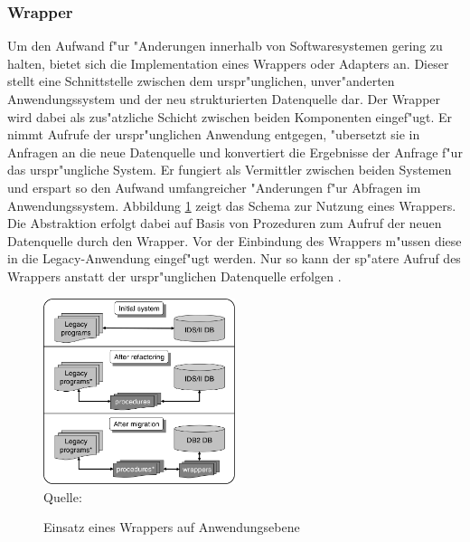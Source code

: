 \subsubsection{Wrapper}

Um den Aufwand f"ur "Anderungen innerhalb von Softwaresystemen gering zu halten, bietet sich die Implementation eines Wrappers oder Adapters an. Dieser stellt eine Schnittstelle zwischen dem urspr"unglichen, unver"anderten Anwendungssystem und der neu strukturierten Datenquelle dar. Der Wrapper wird dabei als zus"atzliche Schicht zwischen beiden Komponenten eingef"ugt. Er nimmt Aufrufe der urspr"unglichen Anwendung entgegen, "ubersetzt sie in Anfragen an die neue Datenquelle und konvertiert die Ergebnisse der Anfrage f"ur das urspr"ungliche System. Er fungiert als Vermittler zwischen beiden Systemen und erspart so den Aufwand umfangreicher "Anderungen f"ur Abfragen im Anwendungssystem.
\lb
Abbildung \ref{pic:application_wrapper} zeigt das Schema zur Nutzung eines Wrappers. Die Abstraktion erfolgt dabei auf Basis von Prozeduren zum Aufruf der neuen Datenquelle durch den Wrapper. Vor der Einbindung des Wrappers m"ussen diese in die Legacy-Anwendung eingef"ugt werden. Nur so kann der sp"atere Aufruf des Wrappers anstatt der urspr"unglichen Datenquelle erfolgen \cite{henrard-2008}. 

\begin{figure}[h!]
	\centering
	\caption{Einsatz eines Wrappers auf Anwendungsebene}
	\label{pic:application_wrapper}
	\includegraphics[width=0.5\textwidth]{../images/large_scale_fig_01.png} \\
	\tiny Quelle: \citep[Abbildung~1]{henrard-2008}
\end{figure}


